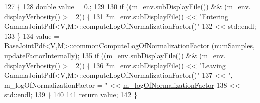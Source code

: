 \begin{DoxyCode}
127 \{
128   \textcolor{keywordtype}{double} value = 0.;
129 
130   \textcolor{keywordflow}{if} ((\hyperlink{class_q_u_e_s_o_1_1_base_scalar_function_adf44141aeb765d97613286f88f235f04}{m\_env}.\hyperlink{class_q_u_e_s_o_1_1_base_environment_a8a0064746ae8dddfece4229b9ad374d6}{subDisplayFile}()) && (\hyperlink{class_q_u_e_s_o_1_1_base_scalar_function_adf44141aeb765d97613286f88f235f04}{m\_env}.
      \hyperlink{class_q_u_e_s_o_1_1_base_environment_a1fe5f244fc0316a0ab3e37463f108b96}{displayVerbosity}() >= 2)) \{
131     *\hyperlink{class_q_u_e_s_o_1_1_base_scalar_function_adf44141aeb765d97613286f88f235f04}{m\_env}.\hyperlink{class_q_u_e_s_o_1_1_base_environment_a8a0064746ae8dddfece4229b9ad374d6}{subDisplayFile}() << \textcolor{stringliteral}{"Entering
       GammaJointPdf<V,M>::computeLogOfNormalizationFactor()"}
132                             << std::endl;
133   \}
134   value = \hyperlink{class_q_u_e_s_o_1_1_base_joint_pdf_a7b7bdd13d2de51198bf75d522e02545b}{BaseJointPdf<V,M>::commonComputeLogOfNormalizationFactor}
      (numSamples, updateFactorInternally);
135   \textcolor{keywordflow}{if} ((\hyperlink{class_q_u_e_s_o_1_1_base_scalar_function_adf44141aeb765d97613286f88f235f04}{m\_env}.\hyperlink{class_q_u_e_s_o_1_1_base_environment_a8a0064746ae8dddfece4229b9ad374d6}{subDisplayFile}()) && (\hyperlink{class_q_u_e_s_o_1_1_base_scalar_function_adf44141aeb765d97613286f88f235f04}{m\_env}.
      \hyperlink{class_q_u_e_s_o_1_1_base_environment_a1fe5f244fc0316a0ab3e37463f108b96}{displayVerbosity}() >= 2)) \{
136     *\hyperlink{class_q_u_e_s_o_1_1_base_scalar_function_adf44141aeb765d97613286f88f235f04}{m\_env}.\hyperlink{class_q_u_e_s_o_1_1_base_environment_a8a0064746ae8dddfece4229b9ad374d6}{subDisplayFile}() << \textcolor{stringliteral}{"Leaving
       GammaJointPdf<V,M>::computeLogOfNormalizationFactor()"}
137                             << \textcolor{stringliteral}{", m\_logOfNormalizationFactor = "} << 
      \hyperlink{class_q_u_e_s_o_1_1_base_joint_pdf_ae82d4191f17af8c7a26226d127bc7850}{m\_logOfNormalizationFactor}
138                             << std::endl;
139   \}
140 
141   \textcolor{keywordflow}{return} value;
142 \}
\end{DoxyCode}
